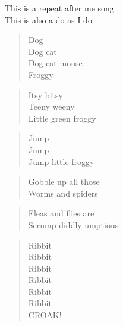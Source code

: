 
This is a repeat after me song \\
This is also a do as I do

\begin{verse}
Dog \\

Dog cat \\

Dog cat mouse \\

Froggy \\
\end{verse}

\begin{verse}
Itsy bitsy \\
Teeny weeny \\
Little green froggy \\
\end{verse}

\begin{verse}
Jump \\
Jump \\
Jump little froggy \\
\end{verse}

\begin{verse}
Gobble up all those \\
Worms and spiders \\
\end{verse}

\begin{verse}
Fleas and flies are \\
Scrump diddly-umptious \\
\end{verse}

\begin{verse}
Ribbit \\
Ribbit \\
Ribbit \\
Ribbit \\
Ribbit \\
Ribbit \\
CROAK! \\
\end{verse}

